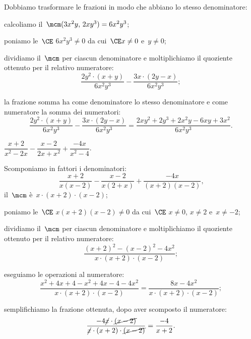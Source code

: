 \begin{exrig}
\begin{esempio}
Dobbiamo trasformare le frazioni in modo che abbiano lo stesso denominatore:
\begin{itemize*}
 \item calcoliamo il~$\mcm(3x^{2}y\text{,~}2xy^{3}) = 6x^{2}y^{3}$;
 \item poniamo le~$\CE$ $6x^{2}y^{3} \neq 0$ da cui~$\CE x \neq 0$ e~$y \neq 0$;
 \item dividiamo il~$\mcm$ per ciascun denominatore e moltiplichiamo il quoziente ottenuto per il relativo numeratore:
    \[\frac{2y^{2}\cdot(x+y)}{6x^{2}y^{3}}-\frac{3x\cdot(2y-x)}{6x^{2}y^{3}};\]
 \item la frazione somma ha come denominatore lo stesso denominatore e come numeratore la somma dei numeratori:
    \begin{equation*}
    \frac{2y^{2}\cdot(x+y)}{6x^{2}y^{3}}-\frac{3x\cdot(2y-x)}{6x^{2}y^{3}}=
    \frac{2xy^{2}+2y^{3}+2x^{2}y-6xy+3x^{2}}{6x^{2}y^{3}}.
    \end{equation*}
\end{itemize*}
 \end{esempio}
\pagebreak
 \begin{esempio}
$\dfrac{x+2}{x^{2}-2x}-\dfrac{x-2}{2x+x^{2}}+\dfrac{-4x}{x^{2}-4}$.
\begin{itemize*}
 \item Scomponiamo in fattori i denominatori:
 \[\frac{x+2}{x(x-2)}-\frac{x-2}{x(2+x)}+\frac{-4x}{(x+2)(x-2)}\text{,}\]
    il~$\mcm$ è~$x\cdot (x+2)\cdot (x-2)$;
 \item poniamo le~$\CE$ $x(x+2)(x-2) \neq 0$ da cui~$\CE$ $x \neq 0$, $x \neq 2$ e~$ x \neq -2$;
 \item dividiamo il~$\mcm$ per ciascun denominatore e moltiplichiamo il quoziente ottenuto per il relativo numeratore:
    \[\frac{(x+2)^{2}-(x-2)^{2}-4x^{2}}{x\cdot(x+2)\cdot(x-2)};\]
 \item eseguiamo le operazioni al numeratore:
    \begin{equation*}
     \frac{x^{2}+4x+4-x^{2}+4x-4-4x^{2}}{x\cdot(x+2)\cdot(x-2)}=\frac{8x-4x^{2}}{x\cdot(x+2)\cdot(x-2)};
     \end{equation*}
 \item semplifichiamo la frazione ottenuta, dopo aver scomposto il numeratore:
    \begin{equation*}
    \frac{-4\cancel{x}\cdot\cancel{(x-2)}}{\cancel{x}\cdot(x+2)\cdot\cancel{(x-2)}}=\frac{-4}{x+2}.
    \end{equation*}
\end{itemize*}
 \end{esempio}


\end{exrig}
